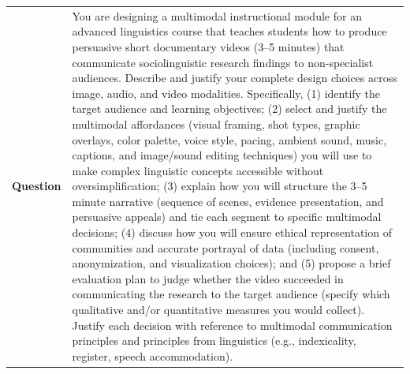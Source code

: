 \begin{longtable}{@{}l p{12.5cm}@{}}
  \textbf{Question} & You are designing a multimodal instructional module for an advanced linguistics course that teaches students how to produce persuasive short documentary videos (3--5 minutes) that communicate sociolinguistic research findings to non-specialist audiences. Describe and justify your complete design choices across image, audio, and video modalities. Specifically, (1) identify the target audience and learning objectives; (2) select and justify the multimodal affordances (visual framing, shot types, graphic overlays, color palette, voice style, pacing, ambient sound, music, captions, and image/sound editing techniques) you will use to make complex linguistic concepts accessible without oversimplification; (3) explain how you will structure the 3--5 minute narrative (sequence of scenes, evidence presentation, and persuasive appeals) and tie each segment to specific multimodal decisions; (4) discuss how you will ensure ethical representation of communities and accurate portrayal of data (including consent, anonymization, and visualization choices); and (5) propose a brief evaluation plan to judge whether the video succeeded in communicating the research to the target audience (specify which qualitative and/or quantitative measures you would collect). Justify each decision with reference to multimodal communication principles and principles from linguistics (e.g., indexicality, register, speech accommodation). \\

\end{longtable}
